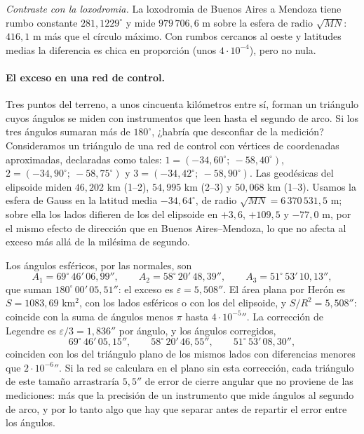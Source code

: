 \emph{Contraste con la loxodromia.} La loxodromia de Buenos Aires a Mendoza tiene rumbo
constante \(281{,}1229^\circ\) y mide \(979\,706{,}6\) m sobre la esfera de radio \(\sqrt{MN}\):
\(416{,}1\) m más que el círculo máximo. Con rumbos cercanos al oeste y latitudes medias la
diferencia es chica en proporción (unos \(4\cdot10^{-4}\)), pero no nula.

\paragraph{El exceso en una red de control.} Tres puntos del terreno, a unos cincuenta
kilómetros entre sí, forman un triángulo cuyos ángulos se miden con instrumentos que leen
hasta el segundo de arco. Si los tres ángulos sumaran más de \(180^\circ\), ¿habría que
desconfiar de la medición? Consideramos un triángulo de una red de control
con vértices de coordenadas aproximadas, declaradas como tales: \(1=(-34{,}60^\circ;\
-58{,}40^\circ)\), \(2=(-34{,}90^\circ;\ -58{,}75^\circ)\) y \(3=(-34{,}42^\circ;\
-58{,}90^\circ)\). Las geodésicas del elipsoide miden \(46{,}202\) km (1--2), \(54{,}995\) km
(2--3) y \(50{,}068\) km (1--3). Usamos la esfera de Gauss en la latitud media
\(-34{,}64^\circ\), de radio \(\sqrt{MN}=6\,370\,531{,}5\) m; sobre ella los lados difieren de
los del elipsoide en \(+3{,}6\), \(+109{,}5\) y \(-77{,}0\) m, por el mismo efecto de dirección que
en Buenos Aires--Mendoza, lo que no afecta al exceso más allá de la milésima de segundo.

Los ángulos esféricos, por las normales, son
\[
  A_1=69^\circ\,46'\,06{,}99'',\qquad A_2=58^\circ\,20'\,48{,}39'',\qquad A_3=51^\circ\,53'\,10{,}13'',
\]
que suman \(180^\circ\,00'\,05{,}51''\): el exceso es \(\varepsilon=5{,}508''\). El área plana
por Herón es \(S=1083{,}69\) km\(^2\), con los lados esféricos o con los del elipsoide, y
\(S/R^2=5{,}508''\): coincide con la suma de ángulos menos \(\pi\) hasta
\(4\cdot10^{-5}{}''\). La corrección de Legendre es \(\varepsilon/3=1{,}836''\) por ángulo, y
los ángulos corregidos,
\[
  69^\circ\,46'\,05{,}15'',\qquad 58^\circ\,20'\,46{,}55'',\qquad 51^\circ\,53'\,08{,}30'',
\]
coinciden con los del triángulo plano de los mismos lados con diferencias menores que
\(2\cdot10^{-6}{}''\). Si la red se calculara en el plano sin esta corrección, cada triángulo
de este tamaño arrastraría \(5{,}5''\) de error de cierre angular que no proviene de las
mediciones: más que la precisión de un instrumento que mide ángulos al segundo de arco, y por
lo tanto algo que hay que separar antes de repartir el error entre los ángulos.

